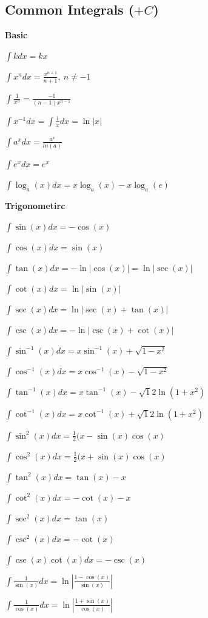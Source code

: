 \documentclass[8pt,a4paper]{extarticle}     %
\theoremstyle{definition}
\theoremstyle{definition}
\theoremstyle{definition}
\begin{document}
\begin{multicols}{4}
\subsection{Common Integrals ($+C$)}
\begin{bulletlist}
	\item [] \textbf{Basic}
	\item $\int kdx = kx$
	\item $\int x^ndx = \frac{x^{n+1}}{n+1}, \ n\neq-1$
	\item $\int \frac{1}{x^n} = \frac{-1}{(n-1)x^{n-1}}$
	\item $\int x^{-1}dx = \int \frac{1}{x}dx = \ln|x|$
	\item $\int a^x dx = \frac{a^x}{ln(a)}$
	\item $\int e^x dx = e^x$
	\item $\int \log_a(x)dx = x\log_a(x)-x\log_a(e)$
	\item [] \textbf{Trigonometirc}
	\item $\int \sin(x)dx = -\cos(x)$
	\item $\int \cos(x)dx = \sin(x)$
	\item $\int \tan(x)dx = -\ln|\cos(x)| = \ln|\sec(x)|$
	\item $\int \cot(x)dx = \ln|\sin(x)|$
	\item $\int \sec(x)dx = \ln|\sec(x)+\tan(x)|$
	\item $\int \csc(x)dx = -\ln|\csc(x)+\cot(x)|$
	\item $\int \sin^{-1}(x)dx = x\sin^{-1}(x)+\sqrt{1-x^2}$
	\item $\int \cos^{-1}(x)dx = x\cos^{-1}(x)-\sqrt{1-x^2}$
	\item $\int \tan^{-1}(x)dx = x\tan^{-1}(x)-\sqrt{1}{2}\ln(1+x^2)$
	\item $\int \cot^{-1}(x)dx = x\cot^{-1}(x)+\sqrt{1}{2}\ln(1+x^2)$
	\item $\int \sin^2(x)dx = \frac{1}{2}(x-\sin(x)\cos(x)$
	\item $\int \cos^2(x)dx = \frac{1}{2}(x+\sin(x)\cos(x)$
	\item $\int \tan^2(x)dx = \tan(x)-x$
	\item $\int \cot^2(x)dx = -\cot(x)-x$
	\item $\int \sec^2(x)dx = \tan(x)$
	\item $\int \csc^2(x)dx = -\cot(x)$
	\item $\int \csc(x)\cot(x)dx = -\csc(x)$ 
	\item $\int \frac{1}{\sin(x)}dx = \ln\left|\frac{1-\cos(x)}{\sin(x)}\right|$
	\item $\int \frac{1}{\cos(x)}dx = \ln\left|\frac{1+\sin(x)}{\cos(x)}\right|$

\end{bulletlist}
\end{multicols}
\end{document}
